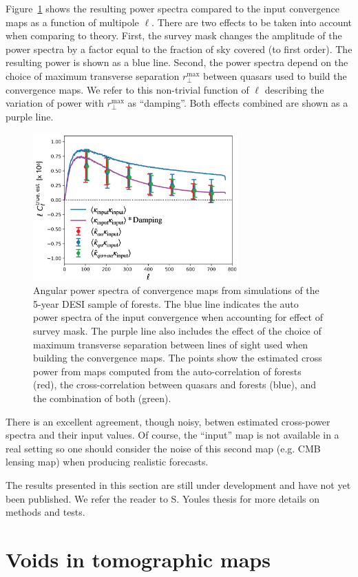 Figure~\ref{fig:forest_lensing_power_spectra} shows the resulting power spectra
compared to the input convergence maps as a function of multipole $\ell$. 
There are two effects to be taken into account when comparing to theory. 
First, the survey mask changes the amplitude of the power spectra by a factor equal 
to the fraction of sky covered (to first order). The resulting power is shown as a blue line. 
Second, the power spectra depend on the choice of maximum transverse separation $r_\perp^\mathrm{max}$ 
between quasars used to build the convergence maps. 
We refer to this non-trivial function of $\ell$ describing 
the variation of power with $r_\perp^\mathrm{max}$
as ``damping''. Both effects combined are shown as a purple line.


\begin{figure}
    \centering
    \includegraphics[width=0.7\textwidth]{fig/forests/forest_lensing_power_spectra.png}
    \caption{Angular power spectra of convergence maps from simulations of the 5-year DESI sample of \lya forests. 
    The blue line indicates the auto power spectra of the input convergence when 
    accounting for effect of survey mask. The purple line also includes the effect of 
    the choice of maximum transverse separation between lines of sight used when 
    building the convergence maps. The points show the estimated cross power 
    from maps computed from the auto-correlation of forests (red), the cross-correlation 
    between quasars and forests (blue), and the combination of both (green). 
    }
    \label{fig:forest_lensing_power_spectra}
\end{figure}

There is an excellent agreement, though noisy, betwen estimated cross-power spectra  
and their input values. Of course, the ``input'' map is not available in a real setting 
so one should consider the noise of this second map (e.g. CMB lensing map) when producing
realistic forecasts. 

The results presented in this section are still under development and have not yet  
been published. We refer the reader to S. Youles thesis for more details on methods 
and tests. 




\section{Voids in tomographic maps}
\label{forests:voids}

\cite{ravouxFirstMeasurementCorrelation2022}



